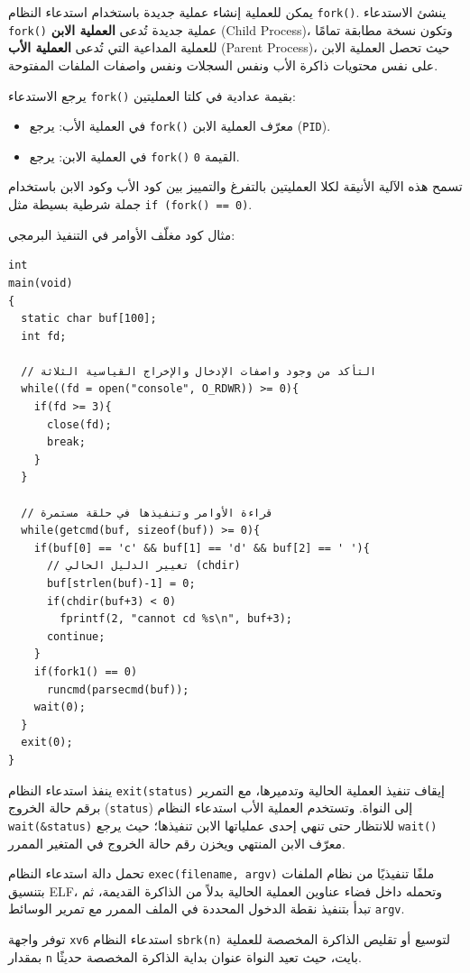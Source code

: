 يمكن للعملية إنشاء عملية جديدة باستخدام استدعاء النظام \texttt{fork()}. ينشئ الاستدعاء \texttt{fork()} عملية جديدة تُدعى \textbf{العملية الابن} (Child Process)، وتكون نسخة مطابقة تمامًا للعملية المداعية التي تُدعى \textbf{العملية الأب} (Parent Process)، حيث تحصل العملية الابن على نفس محتويات ذاكرة الأب ونفس السجلات ونفس واصفات الملفات المفتوحة.

يرجع الاستدعاء \texttt{fork()} بقيمة عدادية في كلتا العمليتين:
\begin{itemize}
  \item في العملية الأب: يرجع \texttt{fork()} معرّف العملية الابن (\texttt{PID}).
  \item في العملية الابن: يرجع \texttt{fork()} القيمة \texttt{0}.
\end{itemize}
تسمح هذه الآلية الأنيقة لكلا العمليتين بالتفرغ والتمييز بين كود الأب وكود الابن باستخدام جملة شرطية بسيطة مثل \texttt{if (fork() == 0)}.

مثال كود مغلّف الأوامر في التنفيذ البرمجي:
\begin{lstlisting}
int
main(void)
{
  static char buf[100];
  int fd;

  // التأكد من وجود واصفات الإدخال والإخراج القياسية الثلاثة
  while((fd = open("console", O_RDWR)) >= 0){
    if(fd >= 3){
      close(fd);
      break;
    }
  }

  // قراءة الأوامر وتنفيذها في حلقة مستمرة
  while(getcmd(buf, sizeof(buf)) >= 0){
    if(buf[0] == 'c' && buf[1] == 'd' && buf[2] == ' '){
      // تغيير الدليل الحالي (chdir)
      buf[strlen(buf)-1] = 0;
      if(chdir(buf+3) < 0)
        fprintf(2, "cannot cd %s\n", buf+3);
      continue;
    }
    if(fork1() == 0)
      runcmd(parsecmd(buf));
    wait(0);
  }
  exit(0);
}
\end{lstlisting}

ينفذ استدعاء النظام \texttt{exit(status)} إيقاف تنفيذ العملية الحالية وتدميرها، مع التمرير برقم حالة الخروج (\texttt{status}) إلى النواة. وتستخدم العملية الأب استدعاء النظام \texttt{wait(\&status)} للانتظار حتى تنهي إحدى عملياتها الابن تنفيذها؛ حيث يرجع \texttt{wait()} معرّف الابن المنتهي ويخزن رقم حالة الخروج في المتغير الممرر.

تحمل دالة استدعاء النظام \texttt{exec(filename, argv)} ملفًا تنفيذيًا من نظام الملفات بتنسيق ELF، وتحمله داخل فضاء عناوين العملية الحالية بدلاً من الذاكرة القديمة، ثم تبدأ بتنفيذ نقطة الدخول المحددة في الملف الممرر مع تمرير الوسائط \texttt{argv}.

توفر واجهة \texttt{xv6} استدعاء النظام \texttt{sbrk(n)} لتوسيع أو تقليص الذاكرة المخصصة للعملية بمقدار \texttt{n} بايت، حيث تعيد النواة عنوان بداية الذاكرة المخصصة حديثًا.

